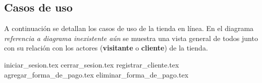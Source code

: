%
%

\subsection{Casos de uso}

A continuación se detallan los casos de uso de la tienda en línea. En el
diagrama \textit{referencia a diagrama inexistente aún} se muestra una vista
general de todos junto con su relación con los actores (\textbf{visitante} o
\textbf{cliente}) de la tienda.


{iniciar_sesion.tex}
{cerrar_sesion.tex}
{registrar_cliente.tex}
{agregar_forma_de_pago.tex}
{eliminar_forma_de_pago.tex}
